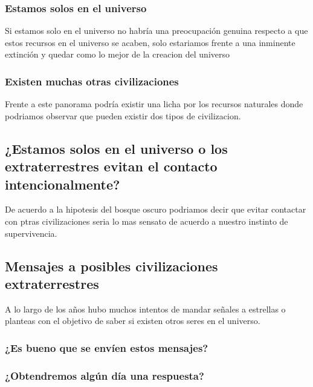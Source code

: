 \documentclass[12pt a4paper]{article}
\begin{document}
\subsubsection{Estamos solos en el universo}
Si estamos solo en el universo no habría una preocupación genuina respecto a que estos recursos en el universo se acaben, solo estariamos frente a una inminente extinción y quedar como lo mejor de la creacion del universo
\subsubsection{Existen muchas otras civilizaciones}
Frente a este panorama podría existir una licha por los recursos naturales donde podriamos observar que pueden existir dos tipos de civilizacion.
\subsection{¿Estamos solos en el universo o los extraterrestres evitan el contacto intencionalmente?}
De acuerdo a la hipotesis del bosque oscuro podriamos decir que evitar contactar con ptras civilizaciones seria lo mas sensato de acuerdo a nuestro instinto de supervivencia.
\subsection{Mensajes a posibles civilizaciones extraterrestres}
A lo largo de los años hubo muchos intentos de mandar señales a estrellas o planteas con el objetivo de saber si existen otros seres en el universo.
\subsubsection{¿Es bueno que se envíen estos mensajes?}
\subsubsection{¿Obtendremos algún día una respuesta?}
\end{document}
